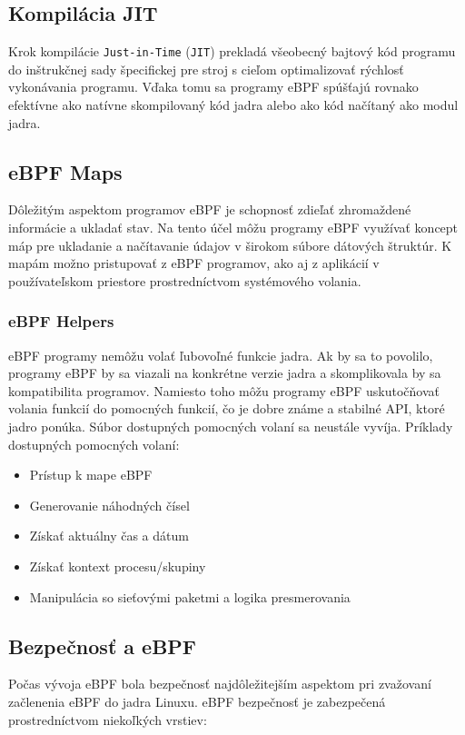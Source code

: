 \subsection{Kompilácia JIT}
Krok kompilácie \texttt{Just-in-Time} (\texttt{JIT}) prekladá všeobecný bajtový kód programu do inštrukčnej sady špecifickej pre stroj s cieľom optimalizovať rýchlosť vykonávania programu. Vďaka tomu sa programy eBPF spúšťajú rovnako efektívne ako natívne skompilovaný kód jadra alebo ako kód načítaný ako modul jadra.

\subsection{eBPF Maps}
Dôležitým aspektom programov eBPF je schopnosť zdieľať zhromaždené informácie a ukladať stav. Na tento účel môžu programy eBPF využívať koncept máp pre ukladanie a načítavanie údajov v širokom súbore dátových štruktúr. K mapám možno pristupovať z eBPF programov, ako aj z aplikácií v používateľskom priestore prostredníctvom systémového volania.

\subsubsection{eBPF Helpers}
eBPF programy nemôžu volať ľubovoľné funkcie jadra. Ak by sa to povolilo, programy eBPF by sa viazali na konkrétne verzie jadra a skomplikovala by sa kompatibilita programov. Namiesto toho môžu programy eBPF uskutočňovať volania funkcií do pomocných funkcií, čo je dobre známe a stabilné API, ktoré jadro ponúka.
Súbor dostupných pomocných volaní sa neustále vyvíja. Príklady dostupných pomocných volaní:
\begin{itemize}
\item Prístup k mape eBPF
\item Generovanie náhodných čísel
\item Získať aktuálny čas a dátum
\item Získať kontext procesu/skupiny
\item Manipulácia so sieťovými paketmi a logika presmerovania
\end{itemize}

\subsection{Bezpečnosť a eBPF}
Počas vývoja eBPF bola bezpečnosť najdôležitejším aspektom pri zvažovaní začlenenia eBPF do jadra Linuxu. 
eBPF bezpečnosť je zabezpečená prostredníctvom niekoľkých vrstiev:

